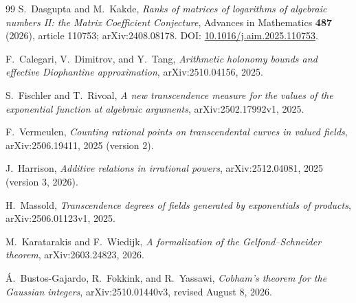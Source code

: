 \documentclass[11pt,oneside]{article}
\theoremstyle{definition}
\theoremstyle{remark}
\begin{document}
\begin{thebibliography}{99}
S.~Dasgupta and M.~Kakde,
\newblock \emph{Ranks of matrices of logarithms of algebraic numbers II: the Matrix
Coefficient Conjecture},
\newblock Advances in Mathematics \textbf{487} (2026), article 110753; arXiv:2408.08178.
\newblock DOI: \href{https://doi.org/10.1016/j.aim.2025.110753}{10.1016/j.aim.2025.110753}.

F.~Calegari, V.~Dimitrov, and Y.~Tang,
\newblock \emph{Arithmetic holonomy bounds and effective Diophantine approximation},
\newblock arXiv:2510.04156, 2025.

S.~Fischler and T.~Rivoal,
\newblock \emph{A new transcendence measure for the values of the exponential function at
algebraic arguments},
\newblock arXiv:2502.17992v1, 2025.

F.~Vermeulen,
\newblock \emph{Counting rational points on transcendental curves in valued fields},
\newblock arXiv:2506.19411, 2025 (version 2).

J.~Harrison,
\newblock \emph{Additive relations in irrational powers},
\newblock arXiv:2512.04081, 2025 (version 3, 2026).

H.~Massold,
\newblock \emph{Transcendence degrees of fields generated by exponentials of products},
\newblock arXiv:2506.01123v1, 2025.

M.~Karatarakis and F.~Wiedijk,
\newblock \emph{A formalization of the Gelfond--Schneider theorem},
\newblock arXiv:2603.24823, 2026.

\'A.~Bustos-Gajardo, R.~Fokkink, and R.~Yassawi,
\newblock \emph{Cobham's theorem for the Gaussian integers},
\newblock arXiv:2510.01440v3, revised August 8, 2026.

\end{thebibliography}
\end{document}
